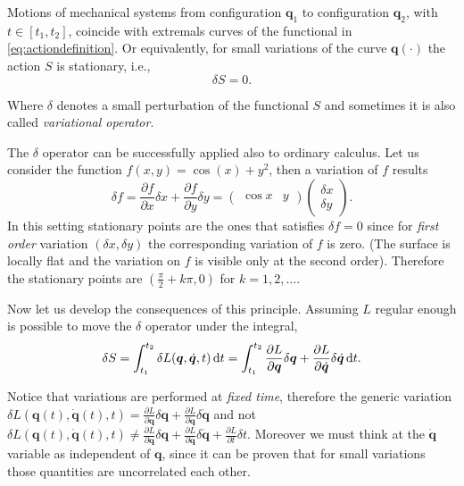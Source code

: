 		\begin{theorem}
			\label{th:stationaryaction}
			Motions of mechanical systems from configuration $\bm{q}_{1}$ to configuration $\bm{q}_{2}$, with $t\in[t_{1},t_{2}]$, coincide with extremals curves of the functional in \cref{eq:actiondefinition}. Or equivalently, for small variations of the curve $\bm{q}(\cdot)$ the action $S$ is stationary, i.e.,
			\begin{equation}
				\delta S = 0.
			\end{equation}
		\end{theorem}
		Where $\delta$ denotes a small perturbation of the functional $S$ and sometimes it is also called \emph{variational operator}.
		\begin{example}
			The $\delta$ operator can be successfully applied also to ordinary calculus. Let us consider the function $f(x,y) = \cos(x) + y^2$, then a variation of $f$ results
			\begin{equation*}
				\delta f = \frac{\partial f}{\partial x}\delta x + \frac{\partial f}{\partial y}\delta y = \begin{pmatrix} \cos{x} & y \end{pmatrix}\begin{pmatrix}\delta x \\ \delta y \end{pmatrix}.
			\end{equation*} 
			In this setting stationary points are the ones that satisfies $\delta f = 0$ since for \emph{first order} variation $(\delta x,\delta y)$ the corresponding variation of $f$ is zero. (The surface is locally flat and the variation on $f$ is visible only at the second order). Therefore the stationary points are $(\frac{\pi}{2}+k\pi,0)$ for $k = 1,2,\dots$.
		\end{example}
		Now let us develop the consequences of this principle. Assuming $L$ regular enough is possible to move the $\delta$ operator under the integral,
		\begin{equation}
			\label{eq:actionvariation}
			\delta S = \int_{t_{1}}^{t_{2}}\delta L(\bm{q},\dot{\bm{q}},t) \mathop{}\!\mathrm{d} t = \int_{t_{1}}^{t_{2}}\frac{\partial L}{\partial \bm{q}}\delta \bm{q} + \frac{\partial L}{\partial \dot{\bm{q}}}\delta\dot{\bm{q}} \mathop{}\!\mathrm{d} t.  
		\end{equation}
		\begin{remark}
			Notice that variations are performed at \emph{fixed time}, therefore the generic variation $\delta L(\bm{q}(t),\bm{\dot{q}}(t),t) = \frac{\partial L}{\partial\bm{q}}\delta \bm{q}+\frac{\partial L}{\partial\bm{\dot{q}}}\delta\bm{\dot{q}}$ and not $\delta L(\bm{q}(t),\bm{\dot{q}}(t),t)\neq\frac{\partial L}{\partial\bm{q}}\delta \bm{q}+\frac{\partial L}{\partial\bm{\dot{q}}}\delta\bm{\dot{q}}+\frac{\partial L}{\partial t}\delta t$. Moreover we must think at the $\dot{\bm{q}}$ variable as independent of $\bm{q}$, since it can be proven that for small variations those quantities are uncorrelated each other.
		\end{remark}
